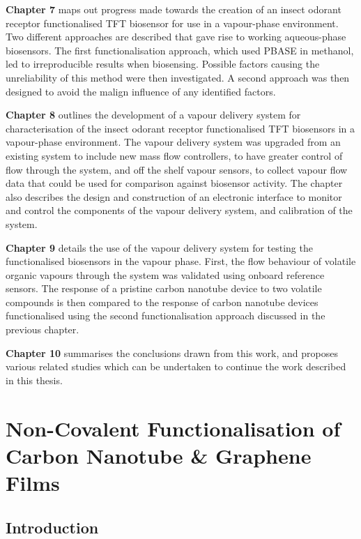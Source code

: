 \documentclass[
  a4paper,
]{scrbook}
\begin{document}
\textbf{Chapter 7} maps out progress made towards the creation of an
insect odorant receptor functionalised TFT biosensor for use in a
vapour-phase environment. Two different approaches are described that
gave rise to working aqueous-phase biosensors. The first
functionalisation approach, which used PBASE in methanol, led to
irreproducible results when biosensing. Possible factors causing the
unreliability of this method were then investigated. A second approach
was then designed to avoid the malign influence of any identified
factors.

\textbf{Chapter 8} outlines the development of a vapour delivery system
for characterisation of the insect odorant receptor functionalised TFT
biosensors in a vapour-phase environment. The vapour delivery system was
upgraded from an existing system to include new mass flow controllers,
to have greater control of flow through the system, and off the shelf
vapour sensors, to collect vapour flow data that could be used for
comparison against biosensor activity. The chapter also describes the
design and construction of an electronic interface to monitor and
control the components of the vapour delivery system, and calibration of
the system.

\textbf{Chapter 9} details the use of the vapour delivery system for
testing the functionalised biosensors in the vapour phase. First, the
flow behaviour of volatile organic vapours through the system was
validated using onboard reference sensors. The response of a pristine
carbon nanotube device to two volatile compounds is then compared to the
response of carbon nanotube devices functionalised using the second
functionalisation approach discussed in the previous chapter.

\textbf{Chapter 10} summarises the conclusions drawn from this work, and
proposes various related studies which can be undertaken to continue the
work described in this thesis.


\hypertarget{sec-noncovalent-functionalisation}{%
\chapter{Non-Covalent Functionalisation of Carbon Nanotube \& Graphene
Films}\label{sec-noncovalent-functionalisation}}

\hypertarget{introduction-1}{%
\section{Introduction}\label{introduction-1}}
\end{document}
